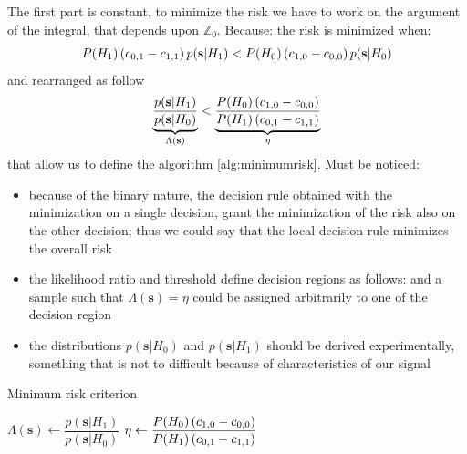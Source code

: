 The first part is constant, to minimize the risk we have to work on the argument of the integral, that depends upon ${\mathbb{Z}_0}$. Because:
the risk is minimized when:
\begin{equation}
P(H_1)\braces{c_{0,1} - c_{1,1}} p(\mathbf{s}|H_1) < P(H_0)\braces{c_{1,0} - c_{0,0}} p(\mathbf{s}|H_0)
\end{equation}
and rearranged as follow
\begin{equation}
\naming{ \dfrac{p(\mathbf{s}|H_1)}{p(\mathbf{s}|H_0)} }{\Lambda(\mathbf{s})} < \naming{ \dfrac{P(H_0)\braces{c_{1,0} - c_{0,0}}}{P(H_1)\braces{c_{0,1} - c_{1,1}}} }{\eta}
\end{equation}
that allow us to define the algorithm \ref{alg:minimumrisk}. Must be noticed:
\begin{itemize}
\item because of the binary nature, the decision rule obtained with the minimization on a single decision, grant the minimization of the risk also on the other decision; thus we could say that the local decision rule minimizes the overall risk
\item the likelihood ratio and threshold define decision regions as follows:
and a sample such that $\Lambda(\mathbf{s})=\eta$ could be assigned arbitrarily to one of the decision region
\item the distributions ${p(\mathbf{s}|H_0)}$ and ${p(\mathbf{s}|H_1)}$ should be derived experimentally, something that is not to difficult because of characteristics of our signal
\end{itemize}
\begin{algorithm}[h]
\caption{Minimum risk criterion}
\label{alg:minimumrisk}
$\Lambda(\mathbf{s}) \leftarrow \dfrac{p(\mathbf{s}|H_1)}{p(\mathbf{s}|H_0)} $ \;
$\eta \leftarrow \dfrac{P(H_0)\braces{c_{1,0} - c_{0,0}}}{P(H_1)\braces{c_{0,1} - c_{1,1}}}$ \;
\end{algorithm}

